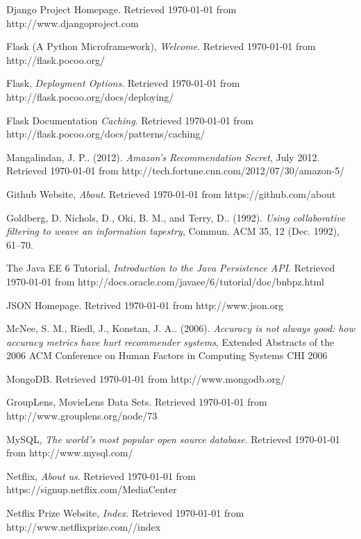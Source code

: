 \begin{thebibliography}{9}
     Django Project Homepage. Retrieved \today{} from http://www.djangoproject.com

     Flask (A Python Microframework), \emph{Welcome}. Retrieved \today{} from http://flask.pocoo.org/

     Flask, \emph{Deployment Options}. Retrieved \today{} from http://flask.pocoo.org/docs/deploying/

     Flask Documentation \emph{Caching}. Retrieved \today{} from http://flask.pocoo.org/docs/patterns/caching/

     Mangalindan, J. P.. (2012). \emph{Amazon's Recommendation Secret}, July 2012. Retrieved \today{} from http://tech.fortune.cnn.com/2012/07/30/amazon-5/

     Github Website, \emph{About}. Retrieved \today{} from https://github.com/about

     Goldberg, D. Nichols, D., Oki, B. M., and Terry, D.. (1992). \emph{Using collaborative filtering to weave an information tapestry}, Commun. ACM 35, 12 (Dec. 1992), 61--70.

     The Java EE 6 Tutorial, \emph{Introduction to the Java Persistence API}. Retrieved \today{} from http://docs.oracle.com/javaee/6/tutorial/doc/bnbpz.html

     JSON Homepage. Retrived \today{} from http://www.json.org

     McNee, S. M., Riedl, J., Konstan, J. A.. (2006). \emph{Accuracy is not always good: how accuracy metrics have hurt recommender systems}, Extended Abstracts of the 2006 ACM Conference on Human Factors in Computing Systems CHI 2006

     MongoDB. Retrieved \today{} from http://www.mongodb.org/

     GroupLens, MovieLens Data Sets. Retrieved \today{} from http://www.grouplens.org/node/73

     MySQL, \emph{The world's most popular open source database}. Retrieved \today{} from http://www.mysql.com/

     Netflix, \emph{About us}. Retrieved \today{} from https://signup.netflix.com/MediaCenter

     Netflix Prize Website, \emph{Index}.  Retrieved \today{} from http://www.netflixprize.com//index


\end{thebibliography}
